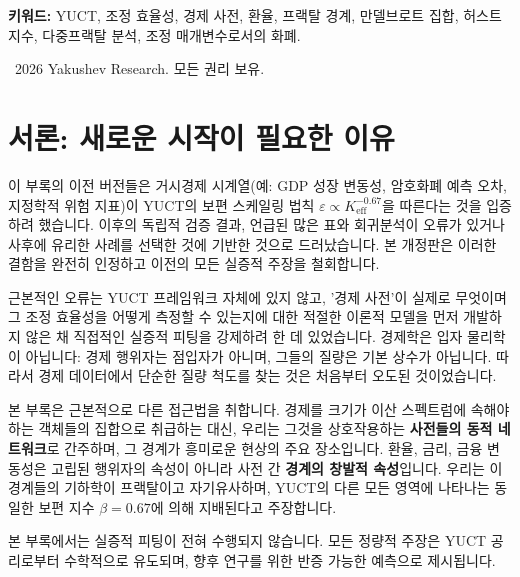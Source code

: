 \documentclass[12pt,a4paper]{article}
\theoremstyle{remark}
\begin{document}
\begin{titlepage}
		\vspace{1cm}
		
		\noindent
		\small\textbf{키워드:} YUCT, 조정 효율성, 경제 사전, 환율, 프랙탈 경계, 만델브로트 집합, 허스트 지수, 다중프랙탈 분석, 조정 매개변수로서의 화폐.
		
		\vspace{0.5cm}
		
		\noindent
		\textcopyright\ 2026 Yakushev Research. 모든 권리 보유.
	\end{titlepage}
	
	\tableofcontents
	\newpage
	
	\section{서론: 새로운 시작이 필요한 이유}
	
	이 부록의 이전 버전들은 거시경제 시계열(예: GDP 성장 변동성, 암호화폐 예측 오차, 지정학적 위험 지표)이 YUCT의 보편 스케일링 법칙 \(\varepsilon \propto K_{\mathrm{eff}}^{-0.67}\)을 따른다는 것을 입증하려 했습니다. 이후의 독립적 검증 결과, 언급된 많은 표와 회귀분석이 오류가 있거나 사후에 유리한 사례를 선택한 것에 기반한 것으로 드러났습니다. 본 개정판은 이러한 결함을 완전히 인정하고 이전의 모든 실증적 주장을 철회합니다.
	
	근본적인 오류는 YUCT 프레임워크 자체에 있지 않고, '경제 사전'이 실제로 무엇이며 그 조정 효율성을 어떻게 측정할 수 있는지에 대한 적절한 이론적 모델을 먼저 개발하지 않은 채 직접적인 실증적 피팅을 강제하려 한 데 있었습니다. 경제학은 입자 물리학이 아닙니다: 경제 행위자는 점입자가 아니며, 그들의 질량은 기본 상수가 아닙니다. 따라서 경제 데이터에서 단순한 질량 척도를 찾는 것은 처음부터 오도된 것이었습니다.
	
	본 부록은 근본적으로 다른 접근법을 취합니다. 경제를 크기가 이산 스펙트럼에 속해야 하는 객체들의 집합으로 취급하는 대신, 우리는 그것을 상호작용하는 \textbf{사전들의 동적 네트워크}로 간주하며, 그 경계가 흥미로운 현상의 주요 장소입니다. 환율, 금리, 금융 변동성은 고립된 행위자의 속성이 아니라 사전 간 \textbf{경계의 창발적 속성}입니다. 우리는 이 경계들의 기하학이 프랙탈이고 자기유사하며, YUCT의 다른 모든 영역에 나타나는 동일한 보편 지수 \(\beta = 0.67\)에 의해 지배된다고 주장합니다.
	
	본 부록에서는 실증적 피팅이 전혀 수행되지 않습니다. 모든 정량적 주장은 YUCT 공리로부터 수학적으로 유도되며, 향후 연구를 위한 반증 가능한 예측으로 제시됩니다.
	
\end{document}
